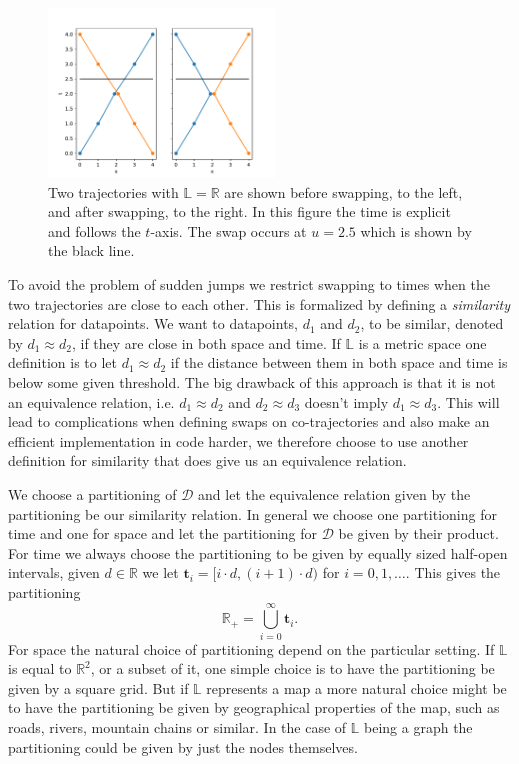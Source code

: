 \documentclass[12pt]{article}
\newcommand{\R}{\mathbb{R}}
\newcommand{\data}{d}
\newcommand{\swaptime}{u}
\newcommand{\locset}{\mathbb{L}}
\newcommand{\timeset}{\mathbb{R}_+}
\newcommand{\dataset}{\mathcal{D}}
\newcommand{\timint}{\mathbf{t}}
\theoremstyle{definition}
\begin{document}
\begin{figure}
  \centering
  \includegraphics[width=6cm]{swapping-tempo-spatial.pdf}
  \caption{Two trajectories with \(\locset = \R\) are shown before
    swapping, to the left, and after swapping, to the right. In this
    figure the time is explicit and follows the \(t\)-axis. The swap
    occurs at \(\swaptime = 2.5\) which is shown by the black line.}
  \label{fig:swapping-tempo-spatial}
\end{figure}

To avoid the problem of sudden jumps we restrict swapping to times
when the two trajectories are close to each other. This is formalized
by defining a \emph{similarity} relation for datapoints. We want to
datapoints, \(\data_{1}\) and \(\data_{2}\), to be similar, denoted
by \(\data_{1} \approx \data_{2}\), if they are close in both space
and time. If \(\locset\) is a metric space one definition is to let
\(\data_{1} \approx \data_{2}\) if the distance between them in both
space and time is below some given threshold. The big drawback of this
approach is that it is not an equivalence relation, i.e.
\(\data_{1} \approx \data_{2}\) and \(\data_{2} \approx \data_{3}\)
doesn't imply \(\data_{1} \approx \data_{3}\). This will lead to
complications when defining swaps on co-trajectories and also make an
efficient implementation in code harder, we therefore choose to use
another definition for similarity that does give us an equivalence
relation.

We choose a partitioning of \(\dataset\) and let the equivalence
relation given by the partitioning be our similarity relation. In
general we choose one partitioning for time and one for space and let
the partitioning for \(\dataset\) be given by their product. For time
we always choose the partitioning to be given by equally sized
half-open intervals, given \(d \in \R\) we let
\(\timint_{i} = [i \cdot d, (i + 1) \cdot d)\) for
\(i = 0, 1, \dots\). This gives the partitioning
\begin{equation*}
  \timeset = \bigcup_{i = 0}^{\infty} \timint_{i}.
\end{equation*}
For space the natural choice of partitioning depend on the particular
setting. If \(\locset\) is equal to \(\R^{2}\), or a subset of it, one
simple choice is to have the partitioning be given by a square grid.
But if \(\locset\) represents a map a more natural choice might be to
have the partitioning be given by geographical properties of the map,
such as roads, rivers, mountain chains or similar. In the case of
\(\locset\) being a graph the partitioning could be given by just the
nodes themselves.
\end{document}
